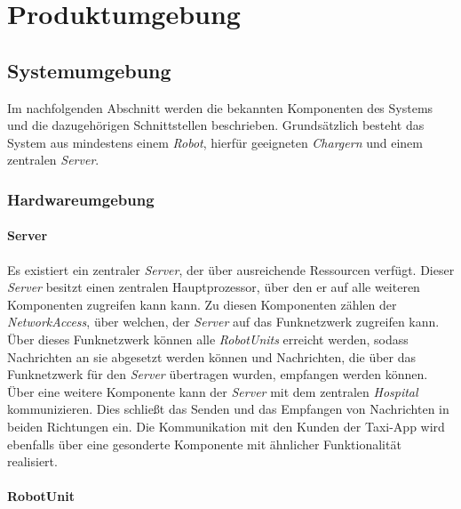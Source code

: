 \section{Produktumgebung}

  \subsection{Systemumgebung}
  Im nachfolgenden Abschnitt werden die bekannten Komponenten des Systems
  und die dazugehörigen Schnittstellen beschrieben. Grundsätzlich besteht
  das System aus mindestens einem \emph{Robot}, hierfür geeigneten
  \emph{Chargern} und einem zentralen \emph{Server}.

  \subsubsection{Hardwareumgebung}

  \paragraph{Server}\label{server}

  Es existiert ein zentraler \emph{Server}, der über ausreichende Ressourcen verfügt. Dieser \emph{Server} besitzt einen zentralen Hauptprozessor, über den er auf alle weiteren Komponenten zugreifen kann kann. Zu diesen Komponenten zählen der \emph{NetworkAccess}, über welchen, der \emph{Server} auf das Funknetzwerk zugreifen kann. Über dieses Funknetzwerk können alle \emph{RobotUnits} erreicht werden, sodass Nachrichten an sie abgesetzt werden können und Nachrichten, die über das Funknetzwerk für den \emph{Server} übertragen wurden, empfangen werden können. Über eine weitere Komponente kann der \emph{Server} mit dem zentralen \emph{Hospital} kommunizieren. Dies schließt das Senden und das Empfangen von Nachrichten in beiden Richtungen ein. Die Kommunikation mit den Kunden der Taxi-App wird ebenfalls über eine gesonderte Komponente mit ähnlicher Funktionalität realisiert.

  \paragraph{RobotUnit}\label{robotunit}

